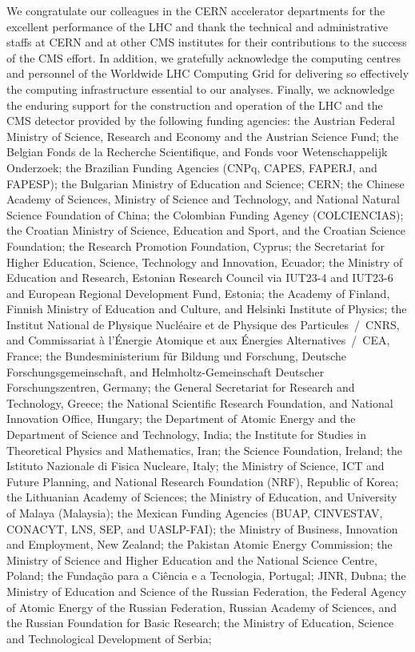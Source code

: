 \clearpage
\begin{acknowledgments}

  We congratulate our colleagues in the CERN accelerator departments for the excellent performance of the LHC and thank the technical and administrative staffs at CERN and at other CMS institutes for their contributions to the success of the CMS effort. In addition, we gratefully acknowledge the computing centres and personnel of the Worldwide LHC Computing Grid for delivering so effectively the computing infrastructure essential to our analyses. Finally, we acknowledge the enduring support for the construction and operation of the LHC and the CMS detector provided by the following funding agencies: the Austrian Federal Ministry of Science, Research and Economy and the Austrian Science Fund; the Belgian Fonds de la Recherche Scientifique, and Fonds voor Wetenschappelijk Onderzoek; the Brazilian Funding Agencies (CNPq, CAPES, FAPERJ, and FAPESP); the Bulgarian Ministry of Education and Science; CERN; the Chinese Academy of Sciences, Ministry of Science and Technology, and National Natural Science Foundation of China; the Colombian Funding Agency (COLCIENCIAS); the Croatian Ministry of Science, Education and Sport, and the Croatian Science Foundation; the Research Promotion Foundation, Cyprus; the Secretariat for Higher Education, Science, Technology and Innovation, Ecuador; the Ministry of Education and Research, Estonian Research Council via IUT23-4 and IUT23-6 and European Regional Development Fund, Estonia; the Academy of Finland, Finnish Ministry of Education and Culture, and Helsinki Institute of Physics; the Institut National de Physique Nucl\'eaire et de Physique des Particules~/~CNRS, and Commissariat \`a l'\'Energie Atomique et aux \'Energies Alternatives~/~CEA, France; the Bundesministerium f\"ur Bildung und Forschung, Deutsche Forschungsgemeinschaft, and Helmholtz-Gemeinschaft Deutscher Forschungszentren, Germany; the General Secretariat for Research and Technology, Greece; the National Scientific Research Foundation, and National Innovation Office, Hungary; the Department of Atomic Energy and the Department of Science and Technology, India; the Institute for Studies in Theoretical Physics and Mathematics, Iran; the Science Foundation, Ireland; the Istituto Nazionale di Fisica Nucleare, Italy; the Ministry of Science, ICT and Future Planning, and National Research Foundation (NRF), Republic of Korea; the Lithuanian Academy of Sciences; the Ministry of Education, and University of Malaya (Malaysia); the Mexican Funding Agencies (BUAP, CINVESTAV, CONACYT, LNS, SEP, and UASLP-FAI); the Ministry of Business, Innovation and Employment, New Zealand; the Pakistan Atomic Energy Commission; the Ministry of Science and Higher Education and the National Science Centre, Poland; the Funda\c{c}\~ao para a Ci\^encia e a Tecnologia, Portugal; JINR, Dubna; the Ministry of Education and Science of the Russian Federation, the Federal Agency of Atomic Energy of the Russian Federation, Russian Academy of Sciences, and the Russian Foundation for Basic Research; the Ministry of Education, Science and Technological Development of Serbia; 
\end{acknowledgments}
